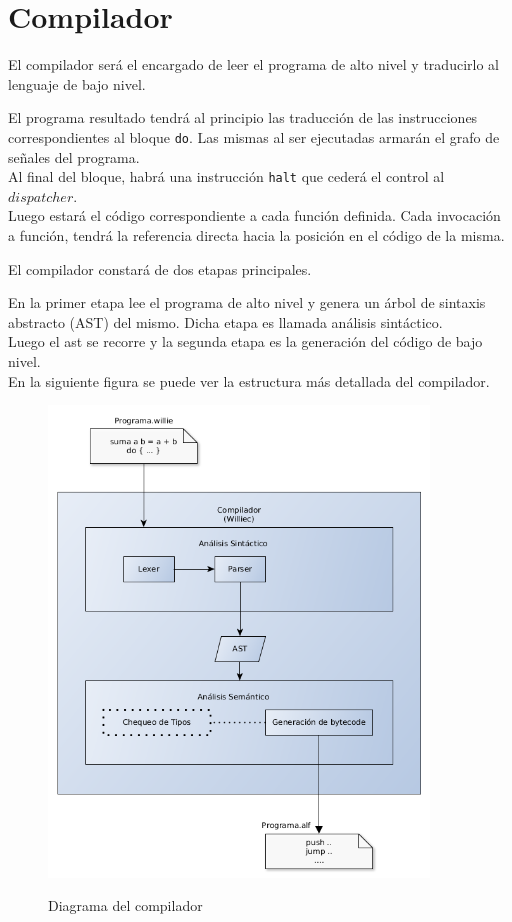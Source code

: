 \pagebreak
\section{Compilador}

  El compilador será el encargado de leer el programa de alto nivel y
traducirlo al lenguaje de bajo nivel.

  El programa resultado tendrá al principio las traducción de las instrucciones
correspondientes al bloque \texttt{do}. Las mismas al ser ejecutadas armarán el
grafo de señales del programa.\\
  Al final del bloque, habrá una instrucción \texttt{halt} que cederá el control
al $dispatcher$.\\
  Luego estará el código correspondiente a cada función definida. Cada invocación
a función, tendrá la referencia directa hacia la posición en el código de la misma.

  El compilador constará de dos etapas principales.

  En la primer etapa lee el programa de alto nivel y
  genera un árbol de sintaxis
  abstracto (AST) del mismo. Dicha etapa es llamada análisis sintáctico.\\

  Luego el ast se recorre y la segunda etapa es la generación del
  código de bajo nivel.\\

  En la siguiente figura se puede ver la estructura más detallada
  del compilador.

\begin{figure}[hp]
\begin{center}
\caption{Diagrama del compilador}
\includegraphics[width=0.9\textwidth]{graphs/compiler.png}
\label{fig:compiler}
\end{center}
\end{figure}

